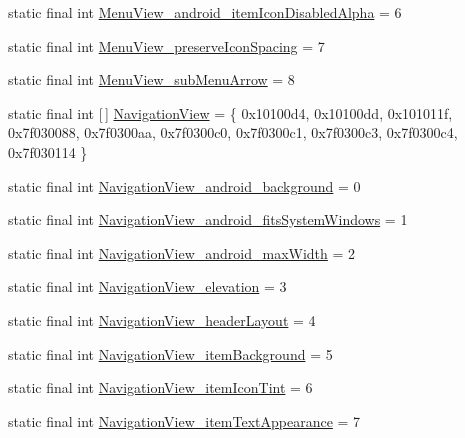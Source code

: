\begin{DoxyCompactItemize}
\item 
static final int \mbox{\hyperlink{classandroid_1_1support_1_1design_1_1_r_1_1styleable_a0798b766a0bf98edc65330f9686e5ce1}{Menu\+View\+\_\+android\+\_\+item\+Icon\+Disabled\+Alpha}} = 6
\item 
static final int \mbox{\hyperlink{classandroid_1_1support_1_1design_1_1_r_1_1styleable_ae40116afa0e62bdf6af6d28c82e6a05e}{Menu\+View\+\_\+preserve\+Icon\+Spacing}} = 7
\item 
static final int \mbox{\hyperlink{classandroid_1_1support_1_1design_1_1_r_1_1styleable_a352b57921080ad1173656d23983518f6}{Menu\+View\+\_\+sub\+Menu\+Arrow}} = 8
\item 
static final int \mbox{[}$\,$\mbox{]} \mbox{\hyperlink{classandroid_1_1support_1_1design_1_1_r_1_1styleable_a277c199f371e8804c26e2cd6dbf88999}{Navigation\+View}} = \{ 0x10100d4, 0x10100dd, 0x101011f, 0x7f030088, 0x7f0300aa, 0x7f0300c0, 0x7f0300c1, 0x7f0300c3, 0x7f0300c4, 0x7f030114 \}
\item 
static final int \mbox{\hyperlink{classandroid_1_1support_1_1design_1_1_r_1_1styleable_a1774b647af0eb6637aea1d2b9ac5d9eb}{Navigation\+View\+\_\+android\+\_\+background}} = 0
\item 
static final int \mbox{\hyperlink{classandroid_1_1support_1_1design_1_1_r_1_1styleable_ab02ea2b7f96484c64a3ebd95e5e2369d}{Navigation\+View\+\_\+android\+\_\+fits\+System\+Windows}} = 1
\item 
static final int \mbox{\hyperlink{classandroid_1_1support_1_1design_1_1_r_1_1styleable_ad1d7cfceea7a309d841cd3db426f7f4c}{Navigation\+View\+\_\+android\+\_\+max\+Width}} = 2
\item 
static final int \mbox{\hyperlink{classandroid_1_1support_1_1design_1_1_r_1_1styleable_a701f3045d0bea3a251d0ea6d82edf2ad}{Navigation\+View\+\_\+elevation}} = 3
\item 
static final int \mbox{\hyperlink{classandroid_1_1support_1_1design_1_1_r_1_1styleable_a4e6b4e11c802a6a9013ba362fd46e781}{Navigation\+View\+\_\+header\+Layout}} = 4
\item 
static final int \mbox{\hyperlink{classandroid_1_1support_1_1design_1_1_r_1_1styleable_ae51d9828828f318e95b0513f0432ca4c}{Navigation\+View\+\_\+item\+Background}} = 5
\item 
static final int \mbox{\hyperlink{classandroid_1_1support_1_1design_1_1_r_1_1styleable_a2dbe4842476f6cbd848e05031cd5d92f}{Navigation\+View\+\_\+item\+Icon\+Tint}} = 6
\item 
static final int \mbox{\hyperlink{classandroid_1_1support_1_1design_1_1_r_1_1styleable_af3af58f69e672c5e0c03df4c759b7c43}{Navigation\+View\+\_\+item\+Text\+Appearance}} = 7

\end{DoxyCompactItemize}
